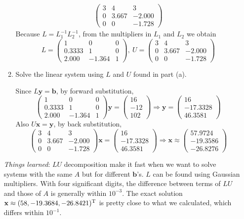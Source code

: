 \documentclass[10pt]{report}
\begin{document}
\begin{enumerate}
\begin{enumerate}
\begin{align*}
\begin{pmatrix}
		3 & 4 & 3\\
		0 & 3.667 & -2.000\\
		0 & 0 & -1.728
		\end{pmatrix}
		\tag{$L_2 A_1= U$}
		\end{align*}
		Because $L = L_1^{-1} L_2^{-1}$, from the multipliers in $L_1$ and $L_2$ we obtain
		\[
		L = \begin{pmatrix}
		1 & 0 & 0\\
		0.3333 & 1 & 0\\
		2.000 & -1.364  & 1
		\end{pmatrix}
		,\ 
		U = \begin{pmatrix}
		3 & 4 & 3\\
		0 & 3.667 & -2.000\\
		0 & 0 & -1.728
		\end{pmatrix}
		\]
		
		\item 
		Solve the linear system using $L$ and $U$ found in part (a).
		
		Since $L\mathbf{y} = \mathbf{b}$, by forward substitution,
		\[
			\begin{pmatrix}
			1 & 0 & 0\\
			0.3333 & 1 & 0\\
			2.000 & -1.364  & 1
			\end{pmatrix}
			\mathbf{y}
			=
			\begin{pmatrix}
			16\\
			-12\\
			102
			\end{pmatrix}
			\Rightarrow
			\mathbf{y}
			=
			\begin{pmatrix}
			16\\
			-17.3328\\
			46.3581
			\end{pmatrix}
		\]
		Also $U\mathbf{x} = \mathbf{y}$, by back substitution,
		\[
		\begin{pmatrix}
		3 & 4 & 3\\
		0 & 3.667 & -2.000\\
		0 & 0 & -1.728
		\end{pmatrix}
		\mathbf{x}
		=
		\begin{pmatrix}
		16\\
		-17.3328\\
		46.3581
		\end{pmatrix}
		\Rightarrow
		\mathbf{x}
		\approx
		\begin{pmatrix}
		57.9724\\
		-19.3586\\
		-26.8276
		\end{pmatrix}
		\]
	\end{enumerate}
	\textit{Things learned}: $LU$ decomposition make it fast when we want to solve systems with the same $A$ but for different $\mathbf{b}$'s. $L$ can be found using Gaussian multipliers. With four significant digits, the difference between terms of $LU$ and those of $A$ is generally within $10^{-3}$. The exact solution $\mathbf{x} \approx (58, -19.3684, -26.8421)^{\rm T}$ is pretty close to what we calculated, which differs within $10^{-1}$.


\end{enumerate}
\end{document}
